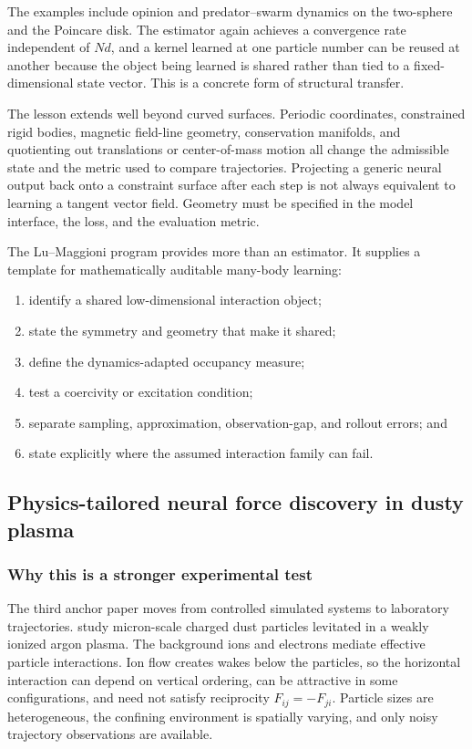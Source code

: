 The examples include opinion and predator--swarm dynamics on the two-sphere and the Poincare disk. The estimator again achieves a convergence rate independent of \(Nd\), and a kernel learned at one particle number can be reused at another because the object being learned is shared rather than tied to a fixed-dimensional state vector. This is a concrete form of structural transfer.

The lesson extends well beyond curved surfaces. Periodic coordinates, constrained rigid bodies, magnetic field-line geometry, conservation manifolds, and quotienting out translations or center-of-mass motion all change the admissible state and the metric used to compare trajectories. Projecting a generic neural output back onto a constraint surface after each step is not always equivalent to learning a tangent vector field. Geometry must be specified in the model interface, the loss, and the evaluation metric.

\begin{takeaway}
The Lu--Maggioni program provides more than an estimator. It supplies a template for mathematically auditable many-body learning:
\begin{enumerate}
  \item identify a shared low-dimensional interaction object;
  \item state the symmetry and geometry that make it shared;
  \item define the dynamics-adapted occupancy measure;
  \item test a coercivity or excitation condition;
  \item separate sampling, approximation, observation-gap, and rollout errors; and
  \item state explicitly where the assumed interaction family can fail.
\end{enumerate}
\end{takeaway}

\subsection{Physics-tailored neural force discovery in dusty plasma}

\subsubsection{Why this is a stronger experimental test}

The third anchor paper moves from controlled simulated systems to laboratory trajectories. \citet{yu2025dusty} study micron-scale charged dust particles levitated in a weakly ionized argon plasma. The background ions and electrons mediate effective particle interactions. Ion flow creates wakes below the particles, so the horizontal interaction can depend on vertical ordering, can be attractive in some configurations, and need not satisfy reciprocity \(F_{ij}=-F_{ji}\). Particle sizes are heterogeneous, the confining environment is spatially varying, and only noisy trajectory observations are available.

